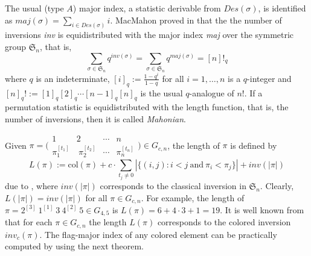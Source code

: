 \documentclass[a4paper,12pt]{article}
\begin{document}
The usual (type $A$) major index, a statistic derivable from $Des (\sigma)$, is identified as $maj (\sigma)= \sum_{i \in Des (\sigma)}i$.
MacMahon proved in \cite{macmahon1915} that the the number of inversions \textit{inv} is equidistributed with the major index \textit{maj} over the symmetric group $\mathfrak{S}_n$, that is, 
$$\sum_{\sigma \in \mathfrak{S}_n}q^{inv(\sigma)}=\sum_{\sigma \in \mathfrak{S}_n}q^{maj(\sigma)}=[n]!_q$$
where $q$ is an indeterminate, $[i]_q:=\frac{1-q^i}{1-q}$ for all $i=1,\ldots,n$ is a $q$-integer and $[n]_q!:=[1]_q [2]_q\cdots [n-1]_q [n]_q$ is the usual $q$-analogue of $n!$.
If a permutation statistic is equidistributed with the length function, that is, the number of inversions, then it is called \textit{Mahonian}.


Given $
\pi = \bigl(\begin{smallmatrix}
	1 & 2 &  \cdots  & n \\
	\pi_1^{[t_1]} & ~\pi_2^{[t_2]}& \cdots   &  \pi_n^{[t_n]}
\end{smallmatrix}\bigr) \in G_{c,n}
$, the length of $\pi$ is defined by 
\begin{equation} \label{length}
L(\pi) := \textrm{col}(\pi)+c \cdot \sum_{t_j \neq 0} |\{(i,j) : i<j ~\textrm{and}~ \pi_i<\pi_j\}|+inv(|\pi|)
\end{equation}
due to \cite{bremke1997}, where $inv(|\pi|)$ corresponds to the classical inversion in $\mathfrak{S}_n$. Clearly, $L(|\pi|)=inv(|\pi|)$ for all $\pi \in G_{c,n}$. For example, the length of $\pi=2^{[3]} ~1^{[1]} ~3~4^{[2]}~5 \in G_{4,5}$ is $L(\pi)=6+4 \cdot 3+1=19$. It is well known from \cite{arslan2024} that for each $\pi \in G_{c,n}$ the length $L(\pi)$ corresponds to the colored inversion $inv_c(\pi)$. The flag-major index of any colored element can be practically computed by using the next theorem.
\end{document}
